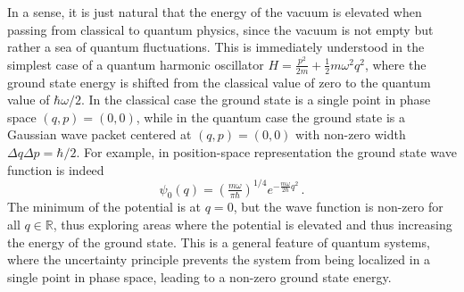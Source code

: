 \documentclass[../QFT_main.tex]{subfiles}
\begin{document}
\begin{mytheorem}
%
In a sense, it is just natural that the energy of the vacuum is elevated when passing from classical to quantum physics, since the vacuum is not empty but rather a sea of quantum fluctuations.
This is immediately understood in the simplest case of a quantum harmonic oscillator $H=\frac{p^2}{2m} + \frac{1}{2} m \omega^2 q^2$, where the ground state energy is shifted from the classical value of zero to the quantum value of $\hbar\omega/2$.
In the classical case the ground state is a single point in phase space $(q,p)=(0,0)$, while in the quantum case the ground state is a Gaussian wave packet centered at $(q,p)=(0,0)$ with non-zero width $\Delta q \Delta p = \hbar/2$.
For example, in position-space representation the ground state wave function is indeed
\begin{equation}
    \psi_0(q) = \left(\tfrac{m\omega}{\pi\hbar}\right)^{1/4} e^{-\frac{m\omega}{2\hbar}q^2}\,.
\end{equation}
The minimum of the potential is at $q=0$, but the wave function is non-zero for all $q\in\mathbb{R}$, thus exploring areas where the potential is elevated and thus increasing the energy of the ground state.
This is a general feature of quantum systems, where the uncertainty principle prevents the system from being localized in a single point in phase space, leading to a non-zero ground state energy.
\end{mytheorem}
\end{document}
